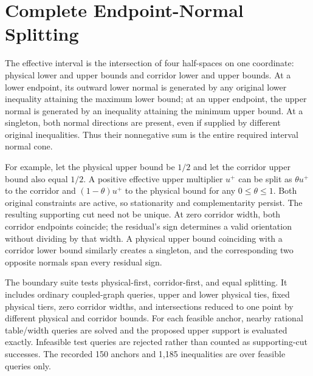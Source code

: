 \section{Complete Endpoint-Normal Splitting}\label{ec:normals}
The effective interval is the intersection of four half-spaces on one coordinate: physical lower and upper bounds and corridor lower and upper bounds. At a lower endpoint, its outward lower normal is generated by any original lower inequality attaining the maximum lower bound; at an upper endpoint, the upper normal is generated by an inequality attaining the minimum upper bound. At a singleton, both normal directions are present, even if supplied by different original inequalities. Thus their nonnegative sum is the entire required interval normal cone.

For example, let the physical upper bound be $1/2$ and let the corridor upper bound also equal $1/2$. A positive effective upper multiplier $u^+$ can be split as $\theta u^+$ to the corridor and $(1-\theta)u^+$ to the physical bound for any $0\leq\theta\leq1$. Both original constraints are active, so stationarity and complementarity persist. The resulting supporting cut need not be unique. At zero corridor width, both corridor endpoints coincide; the residual's sign determines a valid orientation without dividing by that width. A physical upper bound coinciding with a corridor lower bound similarly creates a singleton, and the corresponding two opposite normals span every residual sign.

The boundary suite tests physical-first, corridor-first, and equal splitting. It includes ordinary coupled-graph queries, upper and lower physical ties, fixed physical tiers, zero corridor widths, and intersections reduced to one point by different physical and corridor bounds. For each feasible anchor, nearby rational table/width queries are solved and the proposed upper support is evaluated exactly. Infeasible test queries are rejected rather than counted as supporting-cut successes. The recorded 150 anchors and 1,185 inequalities are over feasible queries only.

